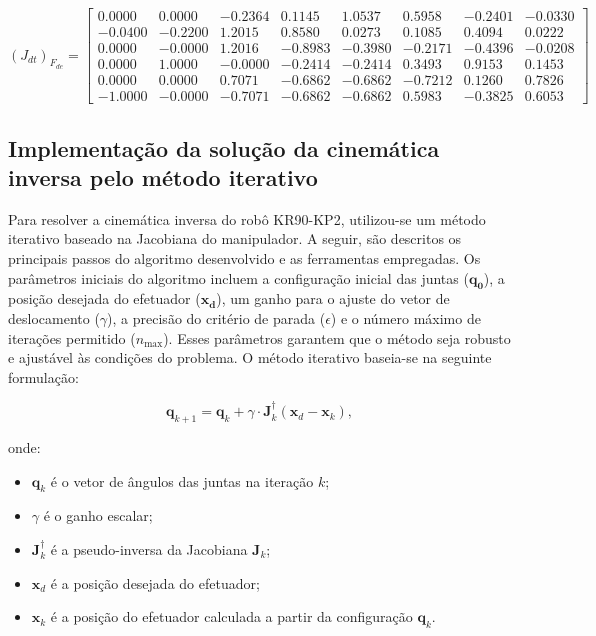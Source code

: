 \documentclass[10pt]{article}
\begin{document}
\begin{equation}
    (J_{dt})_{F_{de}} =
    \begin{bmatrix}
    0.0000 &  0.0000  & -0.2364  &  0.1145  &  1.0537  &  0.5958  & -0.2401  & -0.0330 \\
    -0.0400 & -0.2200  &  1.2015  &  0.8580  &  0.0273  &  0.1085  &  0.4094  &  0.0222 \\
    0.0000 & -0.0000  &  1.2016  & -0.8983  & -0.3980  & -0.2171  & -0.4396  & -0.0208 \\
    0.0000 &  1.0000  & -0.0000  & -0.2414  & -0.2414  &  0.3493  &  0.9153  &  0.1453 \\
    0.0000 &  0.0000  &  0.7071  & -0.6862  & -0.6862  & -0.7212  &  0.1260  &  0.7826 \\
    -1.0000 & -0.0000  & -0.7071  & -0.6862  & -0.6862  &  0.5983  & -0.3825  &  0.6053
    \end{bmatrix}
\end{equation}



\subsection{Implementação da solução da cinemática inversa pelo método iterativo}

\quad Para resolver a cinemática inversa do robô KR90-KP2, utilizou-se um método iterativo baseado na Jacobiana do manipulador.
A seguir, são descritos os principais passos do algoritmo desenvolvido e as ferramentas empregadas.
Os parâmetros iniciais do algoritmo incluem a configuração inicial das juntas ($\mathbf{q_0}$),
a posição desejada do efetuador ($\mathbf{x_d}$), um ganho para o ajuste do vetor de deslocamento ($\gamma$),
a precisão do critério de parada ($\epsilon$) e o número máximo de iterações permitido ($n_{\text{max}}$).
Esses parâmetros garantem que o método seja robusto e ajustável às condições do problema.
O método iterativo baseia-se na seguinte formulação:

\begin{equation}
    \mathbf{q}_{k+1} = \mathbf{q}_k + \gamma \cdot \mathbf{J}_k^\dagger (\mathbf{x}_d - \mathbf{x}_k),
\end{equation}

onde:
\begin{itemize}
    \item $\mathbf{q}_k$ é o vetor de ângulos das juntas na iteração $k$;
    \item $\gamma$ é o ganho escalar;
    \item $\mathbf{J}_k^\dagger$ é a pseudo-inversa da Jacobiana $\mathbf{J}_k$;
    \item $\mathbf{x}_d$ é a posição desejada do efetuador;
    \item $\mathbf{x}_k$ é a posição do efetuador calculada a partir da configuração $\mathbf{q}_k$.
\end{itemize}
\end{document}
